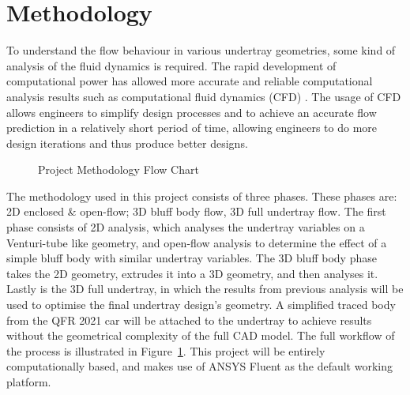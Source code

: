 \section{Methodology}
To understand the flow behaviour in various undertray geometries, some kind of analysis of the fluid dynamics is required. The rapid development of computational power has allowed more accurate and reliable computational analysis results such as computational fluid dynamics (CFD) \cite{Andersson2011ComputationalEngineers}. The usage of CFD allows engineers to simplify design processes and to achieve an accurate flow prediction in a relatively short period of time, allowing engineers to do more design iterations and thus produce better designs.

\begin{figure}[!htb]
    \centering
    \caption{Project Methodology Flow Chart}
    \label{fig:project methodology}
\end{figure}

\noindent The methodology used in this project consists of three phases. These phases are: 2D enclosed \& open-flow; 3D bluff body flow, 3D full undertray flow. The first phase consists of 2D analysis, which analyses the undertray variables on a Venturi-tube like geometry, and open-flow analysis to determine the effect of a simple bluff body with similar undertray variables. The 3D bluff body phase takes the 2D geometry, extrudes it into a 3D geometry, and then analyses it. Lastly is the 3D full undertray, in which the results from previous analysis will be used to optimise the final undertray design's geometry. A simplified traced body from the QFR 2021 car will be attached to the undertray to achieve results without the geometrical complexity of the full CAD model. The full workflow of the process is illustrated in Figure~\ref{fig:project methodology}. This project will be entirely computationally based, and makes use of ANSYS Fluent as the default working platform.

